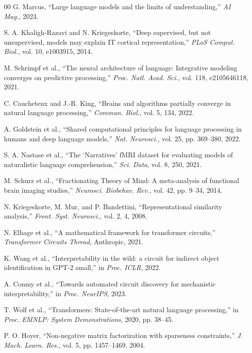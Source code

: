 \documentclass[conference]{IEEEtran}
\begin{document}
\begin{thebibliography}{00}
 G. Marcus, ``Large language models and the limits of understanding,'' \textit{AI Mag.}, 2023.

 S. A. Khaligh-Razavi and N. Kriegeskorte, ``Deep supervised, but not unsupervised, models may explain IT cortical representation,'' \textit{PLoS Comput. Biol.}, vol. 10, e1003915, 2014.

 M. Schrimpf et al., ``The neural architecture of language: Integrative modeling converges on predictive processing,'' \textit{Proc. Natl. Acad. Sci.}, vol. 118, e2105646118, 2021.

 C. Caucheteux and J.-R. King, ``Brains and algorithms partially converge in natural language processing,'' \textit{Commun. Biol.}, vol. 5, 134, 2022.

 A. Goldstein et al., ``Shared computational principles for language processing in humans and deep language models,'' \textit{Nat. Neurosci.}, vol. 25, pp. 369--380, 2022.

 S. A. Nastase et al., ``The `Narratives' fMRI dataset for evaluating models of naturalistic language comprehension,'' \textit{Sci. Data}, vol. 8, 250, 2021.

 M. Schurz et al., ``Fractionating Theory of Mind: A meta-analysis of functional brain imaging studies,'' \textit{Neurosci. Biobehav. Rev.}, vol. 42, pp. 9--34, 2014.

 N. Kriegeskorte, M. Mur, and P. Bandettini, ``Representational similarity analysis,'' \textit{Front. Syst. Neurosci.}, vol. 2, 4, 2008.

 N. Elhage et al., ``A mathematical framework for transformer circuits,'' \textit{Transformer Circuits Thread}, Anthropic, 2021.

 K. Wang et al., ``Interpretability in the wild: a circuit for indirect object identification in GPT-2 small,'' in \textit{Proc. ICLR}, 2022.

 A. Conmy et al., ``Towards automated circuit discovery for mechanistic interpretability,'' in \textit{Proc. NeurIPS}, 2023.

 T. Wolf et al., ``Transformers: State-of-the-art natural language processing,'' in \textit{Proc. EMNLP: System Demonstrations}, 2020, pp. 38--45.

 P. O. Hoyer, ``Non-negative matrix factorization with sparseness constraints,'' \textit{J. Mach. Learn. Res.}, vol. 5, pp. 1457--1469, 2004.

\end{thebibliography}
\end{document}

